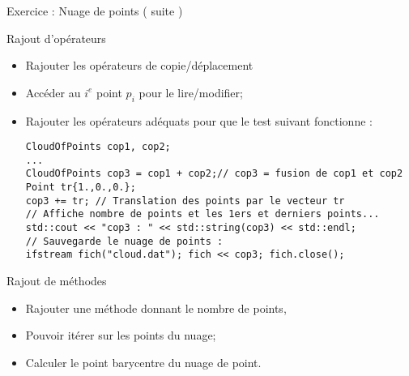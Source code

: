 \documentclass[handout,10pt]{beamer}
\begin{document}
\begin{frame}[fragile]{Exercice : Nuage de points ( suite )}
\tiny
\begin{exampleblock}{Rajout d'opérateurs}
 \begin{itemize}
  \item Rajouter les opérateurs de copie/déplacement
  \item Accéder au $i^{e}$ point $p_{i}$ pour le lire/modifier;
  \item Rajouter les opérateurs adéquats pour que le test suivant fonctionne :
\begin{lstlisting}
CloudOfPoints cop1, cop2;
...
CloudOfPoints cop3 = cop1 + cop2;// cop3 = fusion de cop1 et cop2
Point tr{1.,0.,0.};
cop3 += tr; // Translation des points par le vecteur tr
// Affiche nombre de points et les 1ers et derniers points...
std::cout << "cop3 : " << std::string(cop3) << std::endl;
// Sauvegarde le nuage de points :
ifstream fich("cloud.dat"); fich << cop3; fich.close();
\end{lstlisting}
 \end{itemize}
\end{exampleblock}

\begin{exampleblock}{Rajout de méthodes}
 \begin{itemize}
  \item Rajouter une méthode donnant le nombre de points, 
  \item Pouvoir itérer sur les points du nuage;
  \item Calculer le point barycentre du nuage de point.
 \end{itemize}
\end{exampleblock}

\end{frame}
\end{document}
